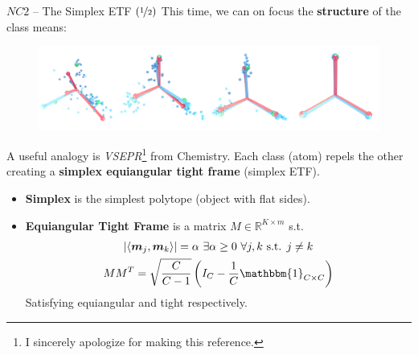 \documentclass{beamer}
\begin{document}
{\let\oldfootnoterule\footnoterule
\def\footnoterule{\only<2->\oldfootnoterule}
\begin{frame}{$NC2$ -- The Simplex ETF $(\nicefrac{1}{2})$}
	This time, we can on focus the \textbf{structure} of the class means:
	\vspace{-.5em}
	\begin{figure}[H]
		\includegraphics[width=\textwidth]{img/nc.png}
	\end{figure} \pause
	\vspace{-1em}
	A useful analogy is \textit{VSEPR}\footnote<2->{I sincerely apologize for making this reference.} from Chemistry. \pause Each class (atom) repels the other creating a \textbf{simplex equiangular tight frame} (simplex ETF). \pause
	\begin{itemize}[label=-]
		\item \textbf{Simplex} is the simplest polytope (object with flat sides). \pause
		\item \textbf{Equiangular Tight Frame} is a matrix $M \in \mathbb{R}^{K \times m}$ s.t.
			\vspace{-.5em}
			\begin{gather}
				|\langle \bm{m}_j, \bm{m}_k \rangle| = \alpha \ \exists \alpha \geq 0\ \forall j,k \text{ s.t. } j \neq k \\
				MM^{T} = \sqrt{\frac{C}{C-1}} \left(I_C - \frac{1}{C} \mathbbm{1}_{C \times C} \right)
			\end{gather}
			\vspace{.5em}
			Satisfying equiangular and tight respectively.
	\end{itemize}
\end{frame}
}
\end{document}
